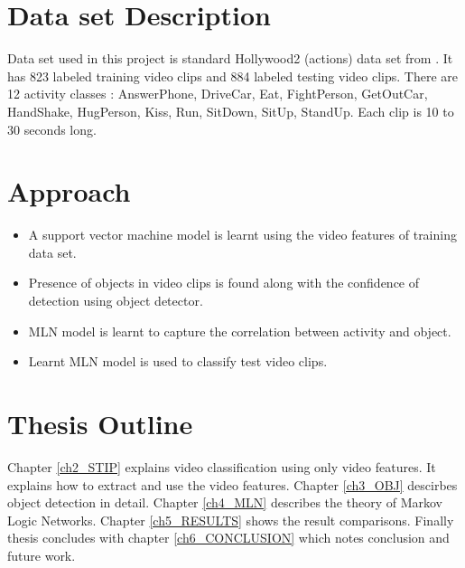 \section{Data set Description}
Data set used in this project is standard Hollywood2 (actions) data set from \cite{actionsInContext}. 
It has 823 labeled training video clips and 884 labeled testing video clips. 
There are 12 activity classes : AnswerPhone, DriveCar, Eat, FightPerson,
 GetOutCar, HandShake, HugPerson, Kiss, Run, SitDown, SitUp, StandUp.
 Each clip is 10 to 30 seconds long.


\section{Approach}
\begin{itemize}
	\item A support vector machine model is learnt using the video features of training data set. 
	\item Presence of objects in video clips is found along with the confidence of detection using object detector. 
	\item MLN model is learnt to capture the correlation between activity and object.
	\item Learnt MLN model is used to classify test video clips.

\end{itemize}

\section{Thesis Outline}
Chapter \ref{ch2_STIP} explains video classification using only video features. It explains how to extract and use the video features. 
Chapter \ref{ch3_OBJ} descirbes object detection in detail. 
Chapter \ref{ch4_MLN} describes the theory of Markov Logic Networks. 
Chapter \ref{ch5_RESULTS} shows the result comparisons.
Finally thesis concludes with chapter \ref{ch6_CONCLUSION} which notes conclusion and future work.

\begin{comment}
\begin{table}
\centering
\begin{tabular}{| c | c |}
\hline
{\bf item 1} & {\bf item 2} \\ \hline
%
abcde & 5 \\ \hline
%
pqrst & 4 \\ \hline
\end{tabular}
\caption{A sample table}
\label{table:1}
\end{table}
\end{comment}


